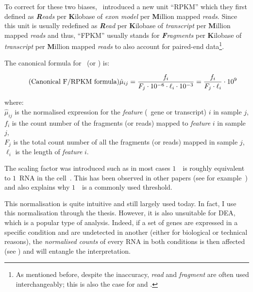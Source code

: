 To correct for these two biases,~\citet{Mortazavi2008} introduced a new unit
\enquote{RPKM} which they first defined as \emph{\textbf{R}eads} per
\textbf{K}ilobase of \emph{exon model} per \textbf{M}illion mapped \emph{reads}.
Since this unit is usually redefined as \emph{\textbf{R}ead} per
\textbf{K}ilobase of \emph{transcript} per \textbf{M}illion mapped \emph{reads}
and thus, \enquote{FPKM} usually stands for  \emph{\textbf{F}ragments} per
\textbf{K}ilobase of \emph{transcript} per \textbf{M}illion mapped \emph{reads}
to also account for paired-end data\footnote{As mentioned before,
despite the inaccuracy, \emph{read} and \emph{fragment} are often used
interchangeably; this is also the case for \emph{\RPKM} and \emph{\FPKM}.}.

The canonical formula for \FPKM\ (or \RPKM) is:

\begin{equation}
    \tag{Canonical F/RPKM formula}\label{eq:rpkm-fx}
\hat{\mu}_{ij}=\frac{f_i}{F_j\cdot10^{-6} \cdot \ell_i\cdot10^{-3}}
              =\frac{f_i}{F_j\cdot\ell_i}\cdot10^{9} \text{\,}
\end{equation}

where: \\{\small
$\hat{\mu}_{ij}$ is the normalised expression for the \emph{feature} (\eg\ gene or
transcript) $i$ in sample $j$,\\
$f_i$ is the count number of the fragments (or reads) mapped to
\emph{feature} $i$ in sample $j$,\\
$F_j$ is the total count number of all the fragments (or reads) mapped in
sample $j$,\\
$\ell_i$ is the length of \emph{feature} $i$.
}

The scaling factor was introduced such as in most cases $1$\ \FPKM\ is
roughly equivalent to $1$\ \gls{RNA} in the cell~. This
has been observed in other papers (see for example~\cite{Hebenstreit:2011}) and
also explains why $1$\ \FPKM\ is a commonly used threshold.%

This normalisation is quite intuitive and still largely used today.
In fact, I use this normalisation through the thesis.
However, it is also unsuitable for
\gls{DEA},
which is a popular type of analysis.
Indeed,
if a set of genes are expressed in a specific condition and are undetected in
another (either for biological or technical reasons), the \emph{normalised counts}
of every \gls{RNA} in both conditions is then affected (see )
and will entangle the interpretation.


